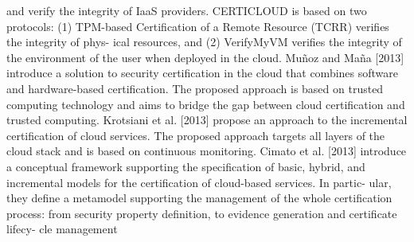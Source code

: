 \documentclass[../main.tex]{subfiles}
\begin{document}
and verify the integrity of IaaS providers. CERTICLOUD is based on two protocols:
(1) TPM-based Certification of a Remote Resource (TCRR) verifies the integrity of phys-
ical resources, and (2) VerifyMyVM verifies the integrity of the environment of the user
when deployed in the cloud. Muñoz and Maña [2013] introduce a solution to security
certification in the cloud that combines software and hardware-based certification. The
proposed approach is based on trusted computing technology and aims to bridge the
gap between cloud certification and trusted computing. Krotsiani et al. [2013] propose
an approach to the incremental certification of cloud services. The proposed approach
targets all layers of the cloud stack and is based on continuous monitoring. Cimato
et al. [2013] introduce a conceptual framework supporting the specification of basic,
hybrid, and incremental models for the certification of cloud-based services. In partic-
ular, they define a metamodel supporting the management of the whole certification
process: from security property definition, to evidence generation and certificate lifecy-
cle management
\end{document}

